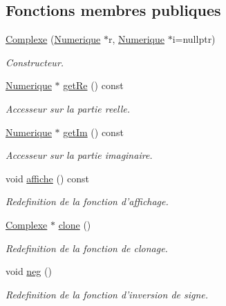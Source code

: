 \subsection*{Fonctions membres publiques}
\begin{CompactItemize}
\item 
\hyperlink{class_complexe_bef2deb54a211490612383ce80657cb6}{Complexe} (\hyperlink{class_numerique}{Numerique} $\ast$r, \hyperlink{class_numerique}{Numerique} $\ast$i=nullptr)
\begin{CompactList}\small\item\em Constructeur. \item\end{CompactList}\item 
\hyperlink{class_numerique}{Numerique} $\ast$ \hyperlink{class_complexe_6485653e44cbffd188a219f9eb023311}{getRe} () const 
\begin{CompactList}\small\item\em Accesseur sur la partie reelle. \item\end{CompactList}\item 
\hyperlink{class_numerique}{Numerique} $\ast$ \hyperlink{class_complexe_116626f10f871db6145b197e392f22dd}{getIm} () const 
\begin{CompactList}\small\item\em Accesseur sur la partie imaginaire. \item\end{CompactList}\item 
\hypertarget{class_complexe_f55c7616e68169f79c26bf38be0318fe}{
void \hyperlink{class_complexe_f55c7616e68169f79c26bf38be0318fe}{affiche} () const }
\label{class_complexe_f55c7616e68169f79c26bf38be0318fe}

\begin{CompactList}\small\item\em Redefinition de la fonction d'affichage. \item\end{CompactList}\item 
\hypertarget{class_complexe_1dc5a5bc3559c7531e4c66f427164b71}{
\hyperlink{class_complexe}{Complexe} $\ast$ \hyperlink{class_complexe_1dc5a5bc3559c7531e4c66f427164b71}{clone} ()}
\label{class_complexe_1dc5a5bc3559c7531e4c66f427164b71}

\begin{CompactList}\small\item\em Redefinition de la fonction de clonage. \item\end{CompactList}\item 
\hypertarget{class_complexe_7496bd8781c9a32fff3b246bfb24b3c5}{
void \hyperlink{class_complexe_7496bd8781c9a32fff3b246bfb24b3c5}{neg} ()}
\label{class_complexe_7496bd8781c9a32fff3b246bfb24b3c5}

\begin{CompactList}\small\item\em Redefinition de la fonction d'inversion de signe. \item\end{CompactList}\end{CompactItemize}


